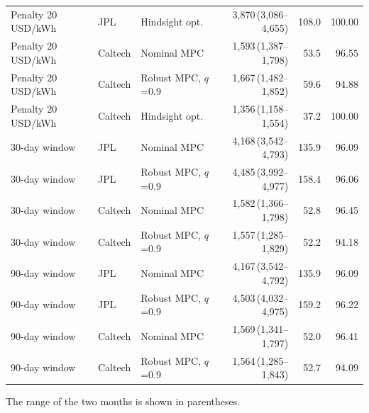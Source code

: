 \begin{table}[!htbp]
\begin{tabular*}{\textwidth}{@{\extracolsep{\fill}}lllrrr@{}}
Penalty 20\,USD/kWh & JPL & Hindsight opt. & 3,870\,{\scriptsize(3,086--4,655)} & 108.0 & 100.00 \\
Penalty 20\,USD/kWh & Caltech & Nominal MPC & 1,593\,{\scriptsize(1,387--1,798)} & 53.5 & 96.55 \\
Penalty 20\,USD/kWh & Caltech & Robust MPC, $q$=0.9 & 1,667\,{\scriptsize(1,482--1,852)} & 59.6 & 94.88 \\
Penalty 20\,USD/kWh & Caltech & Hindsight opt. & 1,356\,{\scriptsize(1,158--1,554)} & 37.2 & 100.00 \\
\hline
30-day window & JPL & Nominal MPC & 4,168\,{\scriptsize(3,542--4,793)} & 135.9 & 96.09 \\
30-day window & JPL & Robust MPC, $q$=0.9 & 4,485\,{\scriptsize(3,992--4,977)} & 158.4 & 96.06 \\
30-day window & Caltech & Nominal MPC & 1,582\,{\scriptsize(1,366--1,798)} & 52.8 & 96.45 \\
30-day window & Caltech & Robust MPC, $q$=0.9 & 1,557\,{\scriptsize(1,285--1,829)} & 52.2 & 94.18 \\
\hline
90-day window & JPL & Nominal MPC & 4,167\,{\scriptsize(3,542--4,792)} & 135.9 & 96.09 \\
90-day window & JPL & Robust MPC, $q$=0.9 & 4,503\,{\scriptsize(4,032--4,975)} & 159.2 & 96.22 \\
90-day window & Caltech & Nominal MPC & 1,569\,{\scriptsize(1,341--1,797)} & 52.0 & 96.41 \\
90-day window & Caltech & Robust MPC, $q$=0.9 & 1,564\,{\scriptsize(1,285--1,843)} & 52.7 & 94.09 \\
\hline
\end{tabular*}
\par\smallskip\parbox{\textwidth}{\scriptsize The range of the two months is shown in parentheses.}
\end{table}
